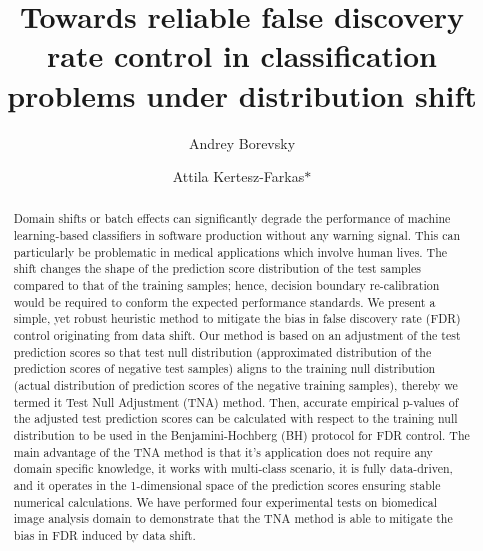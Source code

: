 \documentclass{article}
\author{Andrey Borevsky}
\author{Attila Kertesz-Farkas$\ast$}
\affil{Laboratory on AI for Computational Biology, Faculty of Computer Science, HSE University,  11 Pokrovsky Bvld., Moscow 109028, Russian Federation}
\title{Towards reliable false discovery rate control in classification problems under distribution shift}
\begin{document}
\maketitle

\begin{abstract}
	Domain shifts or batch effects can significantly degrade the performance of machine learning-based classifiers in software production without any warning signal. This can particularly be problematic in medical applications which involve human lives. The shift changes the shape of the prediction score distribution of the test samples compared to that of the training samples; hence, decision boundary re-calibration would be required to conform the expected performance standards. We present a simple, yet robust heuristic method to mitigate the bias in false discovery rate (FDR) control originating from data shift. Our method is based on an adjustment of the test prediction scores so that test null distribution (approximated distribution of the prediction scores of negative test samples) aligns to the training null distribution (actual distribution of prediction scores of the negative training samples), thereby we termed it Test Null Adjustment (TNA) method. Then, accurate empirical p-values of the adjusted test prediction scores can be calculated with respect to the training null distribution to be used in the Benjamini-Hochberg (BH) protocol for FDR control. The main advantage of the TNA method is that it's application does not require any domain specific knowledge, it works with multi-class scenario, it is fully data-driven, and it operates in the 1-dimensional space of the prediction scores ensuring stable numerical calculations. We have performed four experimental tests on biomedical image analysis domain to demonstrate that the TNA method is able to mitigate the bias in FDR induced by data shift. 
	
	

\end{abstract}
\end{document}
